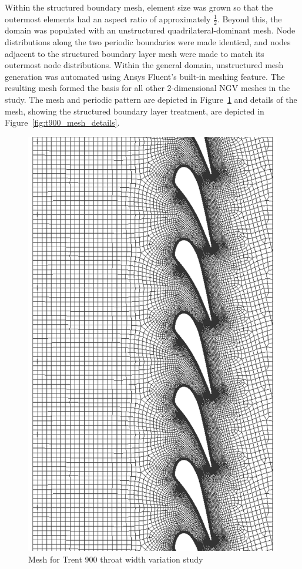 \documentclass[a4paper, 11pt, oneside]{report}
\begin{document}
Within the structured boundary mesh, element size was grown so that the outermost elements had an aspect ratio of approximately $\frac{1}{2}$. Beyond this, the domain was populated with an unstructured quadrilateral-dominant mesh. Node distributions along the two periodic boundaries were made identical, and nodes adjacent to the structured boundary layer mesh were made to match its outermost node distributions. Within the general domain, unstructured mesh generation was automated using Ansys Fluent's built-in meshing feature. The resulting mesh formed the basis for all other 2-dimensional NGV meshes in the study. The mesh and periodic pattern are depicted in Figure~\ref{fig:t900_mesh_whole} and details of the mesh, showing the structured boundary layer treatment, are depicted in Figure~\ref{fig:t900_mesh_details}.

\begin{figure}[H]
      \centering
      \includegraphics[width=.85\textwidth]{figs/t900_mesh_whole.png}
      \caption{Mesh for Trent 900 throat width variation study}
      \label{fig:t900_mesh_whole}
\end{figure}
\end{document}
